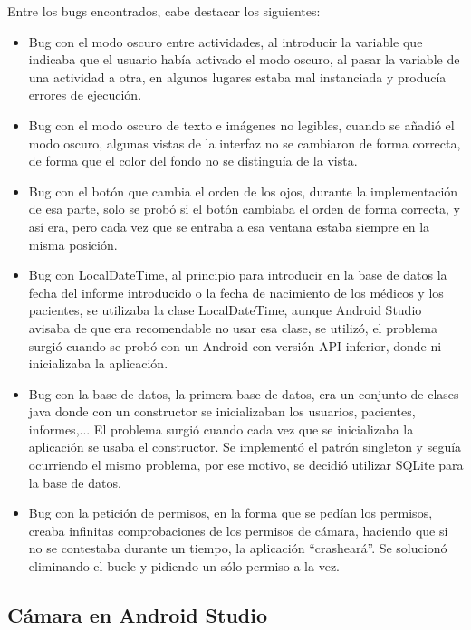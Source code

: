 Entre los bugs encontrados, cabe destacar los siguientes:
\begin{itemize}
    \item Bug con el modo oscuro entre actividades, al introducir la variable que indicaba que el usuario había activado el modo oscuro, al pasar la variable de una actividad a otra, en algunos lugares estaba mal instanciada y producía errores de ejecución.
    \item Bug con el modo oscuro de texto e imágenes no legibles, cuando se añadió el modo oscuro, algunas vistas de la interfaz no se cambiaron de forma correcta, de forma que el color del fondo no se distinguía de la vista.
    \item Bug con el botón que cambia el orden de los ojos, durante la implementación de esa parte, solo se probó si el botón cambiaba el orden de forma correcta, y así era, pero cada vez que se entraba a esa ventana estaba siempre en la misma posición. 

    \item Bug con LocalDateTime, al principio para introducir en la base de datos la fecha del informe introducido o la fecha de nacimiento de los médicos y los pacientes, se utilizaba la clase LocalDateTime, aunque Android Studio avisaba de que era recomendable no usar esa clase, se utilizó, el problema surgió cuando se probó con un Android con versión API inferior, donde ni inicializaba la aplicación.

    \item Bug con la base de datos, la primera base de datos, era un conjunto de clases java donde con un constructor se inicializaban los usuarios, pacientes, informes,... El problema surgió cuando cada vez que se inicializaba la aplicación se usaba el constructor. Se implementó el patrón singleton y seguía ocurriendo el mismo problema, por ese motivo, se decidió utilizar SQLite para la base de datos.

    \item Bug con la petición de permisos, en la forma que se pedían los permisos, creaba infinitas comprobaciones de los permisos de cámara, haciendo que si no se contestaba durante un tiempo, la aplicación ``crasheará''. Se solucionó eliminando el bucle y pidiendo un sólo permiso a la vez. 
\end{itemize}

\subsection{Cámara en Android Studio}

